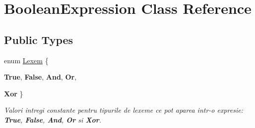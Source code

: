 \hypertarget{classBooleanExpression}{
\section{BooleanExpression Class Reference}
\label{classBooleanExpression}
}
\subsection*{Public Types}
\begin{DoxyCompactItemize}
\item 
enum \hyperlink{classBooleanExpression_a299abbbf6a12738e2d9df792d50ccd76}{Lexem} \{ \par
{\bfseries True}, 
{\bfseries False}, 
{\bfseries And}, 
{\bfseries Or}, 
\par
{\bfseries Xor}
 \}
\begin{DoxyCompactList}\small\item\em Valori intregi constante pentru tipurile de lexeme ce pot aparea intr-\/o expresie: {\bfseries True}, {\bfseries False}, {\bfseries And}, {\bfseries Or} si {\bfseries Xor}. \end{DoxyCompactList}\end{DoxyCompactItemize}
